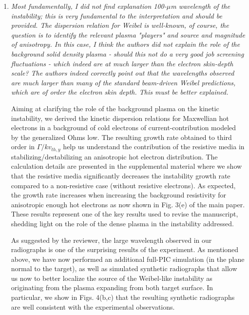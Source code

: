 \documentclass{article}
\begin{document}
\begin{enumerate}
\item \textit{Most fundamentally, I did not find explanation 100-$\mu$m wavelength of the instability; this is very fundamental to the interpretation and should be provided. The dispersion relation for Weibel is well-known, of course, the question is to identify the relevant plasma "players" and source and magnitude of anisotropy. In this case, I think the authors did not explain the role of the background solid density plasma - should this not do a very good job screening fluctuations - which indeed are at much larger than the electron skin-depth scale? The authors indeed correctly point out that the wavelengths observed are much larger than many of the standard beam-driven Weibel predictions, which are of order the electron skin depth. This must be better explained. }

Aiming at clarifying the role of the background plasma on the kinetic instability,
we derived the kinetic dispersion relations for Maxwellian hot electrons in a background of cold electrons of current-contribution modeled by the generalized Ohms low. 
The resulting growth rate obtained to third order in $\Gamma/k v_{th,y}$ help us understand the contribution of the resistive media in stabilizing/destabilizing an anisotropic hot electron distribution. 
The calculation details are presented in the supplemental material where we show that the
resistive media significantly decreases the instability growth rate compared to a non-resistive case (without resistive electrons).
As expected, the growth rate increases when increasing the background resistivity for anisotropic enough hot electrons as now shown in Fig. 3(e) of the main paper.
These results represent one of the key results used to  revise the manuscript,  shedding light on the role of the dense plasma in the instability addressed.

As suggested by the reviewer,   the large wavelength observed in our radiographs is one of the surprising results of the  experiment. As mentioned above, we have now performed an additional full-PIC simulation (in the plane normal to the target), as well as simulated synthetic radiographs that allow us now to better localize the source of the Weibel-like instability as originating from the plasma expanding from both target surface. In particular, we show in Figs. 4(b,c) that the resulting synthetic radiographs are well consistent with the experimental observations. 


\end{enumerate}
\end{document}
